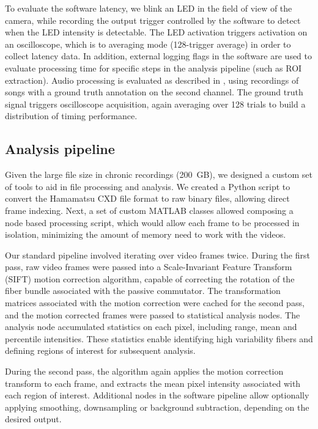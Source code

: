 To evaluate the software latency, we blink an LED in the 
field of view of the camera, while recording the output trigger 
controlled by the software to detect when the LED intensity is 
detectable. The LED activation triggers activation on an 
oscilloscope, which is to averaging mode (128-trigger average) 
in order to collect latency data. In addition, external logging
flags in the software are used to evaluate processing time for 
specific steps in the analysis pipeline (such as ROI extraction).
Audio processing is evaluated as described in \cite{Pearre:2017cs},
using recordings of songs with a ground truth annotation on the 
second channel. The ground truth signal triggers oscilloscope 
acquisition, again averaging over 128 trials to build a distribution 
of timing performance.

\subsection{Analysis pipeline}
\label{sec:pipeline}


Given the large file size in chronic recordings (200~GB), 
we designed a custom set of tools to aid in file 
processing and analysis. We created a Python script to 
convert the Hamamatsu CXD file format to raw binary files, 
allowing direct frame indexing. Next, a set of custom 
MATLAB classes allowed composing a node based processing 
script, which would allow each frame to be processed in 
isolation, minimizing the amount of memory need to work 
with the videos.

Our standard pipeline involved iterating over video frames 
twice. During the first pass, raw video frames were 
passed into a Scale-Invariant Feature Transform (SIFT) 
\cite{vedaldi08vlfeat,lowe1999object,Lowe:2004kp} 
motion correction algorithm, capable of correcting 
the rotation of the fiber bundle associated with the 
passive commutator. The transformation matrices 
associated with the motion correction were cached 
for the second pass, and the motion corrected frames 
were passed to statistical analysis nodes. The analysis 
node accumulated statistics on each pixel, including 
range, mean and percentile intensities. These statistics 
enable identifying high variability fibers and defining 
regions of interest for subsequent analysis.

During the second pass, the algorithm again applies the 
motion correction transform to each frame, and extracts 
the mean pixel intensity associated with each region of 
interest. Additional nodes in the software pipeline allow 
optionally applying smoothing, downsampling or background 
subtraction, depending on the desired output.

